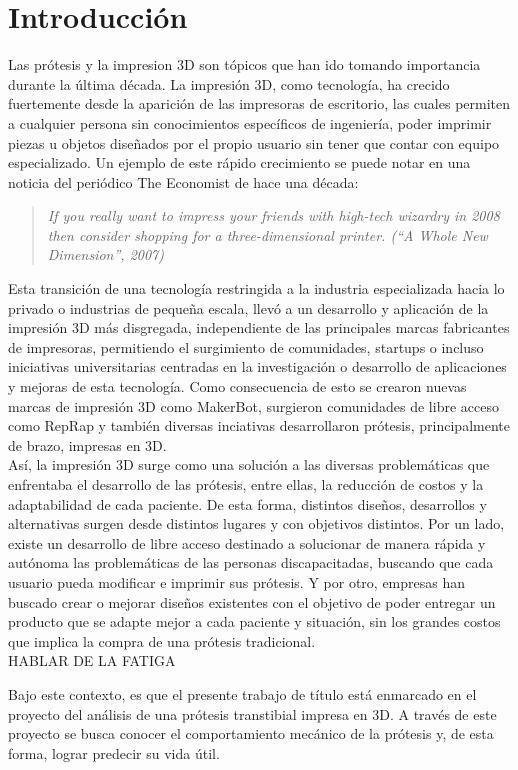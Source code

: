 \chapter{Introducción}

Las prótesis y la impresion 3D son tópicos que han ido tomando importancia durante la última década. La impresión 3D, como tecnología, ha crecido fuertemente desde la aparición de las impresoras de escritorio, las cuales permiten a cualquier persona sin conocimientos específicos de ingeniería, poder imprimir piezas u objetos diseñados por el propio usuario sin tener que contar con equipo especializado. Un ejemplo de este rápido crecimiento se puede notar en una noticia del periódico The Economist de hace una década: 

\begin{quote}
\textit{If you really want to impress your friends with high-tech wizardry in 2008 then consider shopping for a three-dimensional printer. (``A Whole New Dimension'', 2007)}
\end{quote}


Esta transición de una tecnología restringida a la industria especializada hacia lo privado o industrias de pequeña escala, llevó a un desarrollo y aplicación de la impresión 3D más disgregada, independiente de las principales marcas fabricantes de impresoras, permitiendo el surgimiento de comunidades, startups o incluso iniciativas universitarias centradas en la investigación o desarrollo de aplicaciones y mejoras de esta tecnología. Como consecuencia de esto se crearon nuevas marcas de impresión 3D como MakerBot, surgieron comunidades de libre acceso como RepRap y también diversas inciativas desarrollaron prótesis, principalmente de brazo, impresas en 3D.\\

Así, la impresión 3D surge como una solución a las diversas problemáticas que enfrentaba el desarrollo de las prótesis, entre ellas, la reducción de costos y la adaptabilidad de cada paciente. De esta forma, distintos diseños, desarrollos y alternativas surgen desde distintos lugares y con objetivos distintos. Por un lado, existe un desarrollo de libre acceso destinado a solucionar de manera rápida y autónoma las problemáticas de las personas discapacitadas, buscando que cada usuario pueda modificar e imprimir sus prótesis. Y por otro, empresas han buscado crear o mejorar diseños existentes con el objetivo de poder entregar un producto que se adapte mejor a cada paciente y situación, sin los grandes costos que implica la compra de una prótesis tradicional.\\

HABLAR DE LA FATIGA

Bajo este contexto, es que el presente trabajo de título está enmarcado en el proyecto del análisis de una prótesis transtibial impresa en 3D. A través de este proyecto se busca conocer el comportamiento mecánico de la prótesis y, de esta forma, lograr predecir su vida útil.

